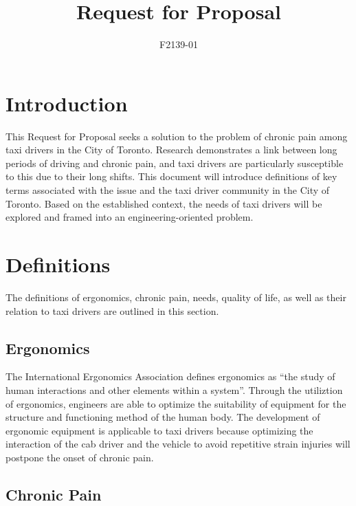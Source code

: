 \documentclass[11pt]{article}
\begin{document}
\title{Request for Proposal}
\author{F2139-01}
\maketitle
\begin{abstract}

\end{abstract}
\section{Introduction}
\label{sec:intro}
This Request for Proposal seeks a solution to the problem of chronic
pain among taxi drivers in the City of Toronto. Research demonstrates a
link between long periods of driving and chronic pain\cite{KneePain,
Okunribido2008}, and taxi drivers are particularly susceptible to this
due to their long shifts\cite{thestar2012, KneePain}. This document will introduce
definitions of key terms associated with the issue and the taxi driver community
in the City of Toronto. Based on the established context, the needs of taxi drivers
will be explored and framed into an engineering-oriented problem. 

\section{Definitions}
\label{sec:defs}
The definitions of ergonomics, chronic pain, needs, quality of life, as
well as their relation to taxi drivers are outlined in this section.

\subsection{Ergonomics}
\label{sec:ergonomics}

The International Ergonomics Association defines ergonomics as “the
study of human interactions and other elements within a system”\cite{ergo}. 
Through the utiliztion of ergonomics, engineers are able to optimize the suitability
of equipment for the structure and functioning method of the human
body. The development of ergonomic equipment is applicable to
taxi drivers because optimizing the interaction of the cab driver
and the vehicle to avoid repetitive strain injuries will postpone
the onset of chronic pain. 

\subsection{Chronic Pain}
\label{sec:pain}
\end{document}
